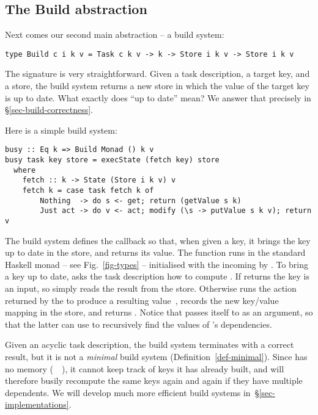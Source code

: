 \subsection{The Build abstraction}\label{sec-general-build}

Next comes our second main abstraction -- a build system:
\vspace{1mm}
\begin{verbatim}
type Build c i k v = Task c k v -> k -> Store i k v -> Store i k v
\end{verbatim}
\vspace{1mm}
The signature is very straightforward.  Given a task description, a target key,
and a store, the build system returns a new store in which the value of the
target key is up to date. What exactly does ``up to date'' mean?  We answer
that precisely in \S\ref{sec-build-correctness}.

\noindent
Here is a simple build system:
\vspace{1mm}
\begin{verbatim}
busy :: Eq k => Build Monad () k v
busy task key store = execState (fetch key) store
  where
    fetch :: k -> State (Store i k v) v
    fetch k = case task fetch k of
        Nothing  -> do s <- get; return (getValue s k)
        Just act -> do v <- act; modify (\s -> putValue s k v); return v
\end{verbatim}
\vspace{1mm}

\noindent
The  build system defines the callback  so that, when given a
key, it brings the key up to date in the store, and returns its value.
The function  runs in the standard Haskell  monad -- see
Fig.~\ref{fig-types} -- initialised with the incoming  by .
To bring a key up to date,  asks the task description  how
to compute . If  returns  the key is an input, so
 simply reads the result from the store. Otherwise  runs
the action  returned by the  to produce a resulting
value~, records the new key/value mapping in the store, and returns .
Notice that  passes itself to  as an argument, so that the
latter can use  to recursively find the values of 's dependencies.

Given an acyclic task description, the  build system terminates with a
correct result, but it is not a \emph{minimal} build system
(Definition~\ref{def-minimal}). Since  has no memory
(~\hs{=}~\hs{()}), it cannot keep track of keys it has already built, and
will therefore busily recompute the same keys again and again if they have
multiple dependents. We will develop much more efficient build systems
in~\S\ref{sec-implementations}.

